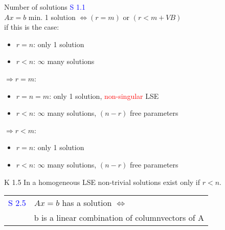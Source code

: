 \begin{mainbox}{Number of solutions}
	\textcolor{blue}{S 1.1}\\
	$Ax = b$ min. 1 solution $\Leftrightarrow (r = m)$ or $(r < m + VB)$\\
	if this is the case:
	\begin{itemize}[noitemsep, topsep=0pt]
		\item $r = n$: only 1 solution
		\item $r < n$: $\infty$ many solutions
	\end{itemize}
	$\Rightarrow r = m$:
	\begin{itemize}[noitemsep, topsep=0pt]
		\item $r = n = m$: only 1 solution, \textcolor{red}{non-singular} LSE
		\item $r < n$: $\infty$ many solutions, $(n-r)$ free parameters
	\end{itemize}
	$\Rightarrow r < m$:
	\begin{itemize}[noitemsep, topsep=0pt]
		\item $r = n$: only 1 solution
		\item $r < n$: $\infty$ many solutions, $(n-r)$ free parameters
	\end{itemize}
	K 1.5 In a homogeneous LSE non-trivial solutions exist only if $r < n$.\\
	\begin{tabular}{ll}
		\textcolor{blue}{S 2.5} & $Ax = b$ has a solution $\Leftrightarrow$\\
		& b is a linear combination of columnvectors of A\\
	\end{tabular}
\end{mainbox}